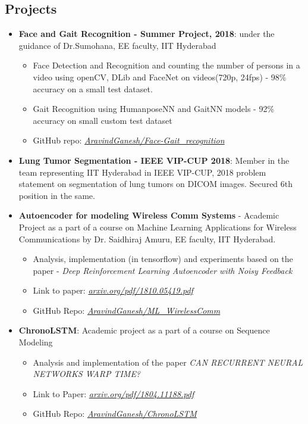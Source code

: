 \documentclass[10pt]{report} %
\begin{document}
\subsection{Projects}
\begin{itemize}
        \item \textbf{Face and Gait Recognition - Summer Project, 2018}: under the guidance of Dr.Sumohana, EE faculty, IIT Hyderabad 
        \begin{itemize}[*]
            \item Face Detection and Recognition and counting the number of persons in a video using openCV, DLib and FaceNet on videos(720p, 24fps) - 98\% accuracy on a small test dataset.
            \item Gait Recognition using HumanposeNN and GaitNN models - 92\% accuracy on small custom test dataset
            \item GitHub repo: \href{https://github.com/AravindGanesh/Face-Gait\_recognition}{\textit{AravindGanesh/Face-Gait\_recognition}}
        \end{itemize}
    
    \item \textbf{Lung Tumor Segmentation - IEEE VIP-CUP 2018}:
    Member in the team representing IIT Hyderabad in IEEE VIP-CUP, 2018 problem statement on segmentation of lung tumors on DICOM images. Secured 6th position in the same.
    \item \textbf{Autoencoder for modeling Wireless Comm Systems} - Academic Project as a part of a course on Machine Learning Applications for Wireless Communications by Dr. Saidhiraj Amuru, EE faculty, IIT Hyderabad.
    \begin{itemize}[*]
        \item Analysis, implementation (in tensorflow) and experiments based on the paper - \textit{Deep Reinforcement Learning Autoencoder with Noisy Feedback}
        \item Link to paper: \href{https://arxiv.org/pdf/1810.05419.pdf}{\textit{arxiv.org/pdf/1810.05419.pdf}}
        \item GitHub Repo: \href{https://github.com/AravindGanesh/ML\_WirelessComm}{\textit{AravindGanesh/ML\_WirelessComm}}

    \end{itemize}
    \item \textbf{ChronoLSTM}: Academic project as a part of a course on Sequence Modeling
    \begin{itemize}[*]
        \item Analysis and implementation of the paper \textit{CAN RECURRENT NEURAL NETWORKS WARP TIME?}
        \item Link to Paper: \href{ https://arxiv.org/pdf/1804.11188.pdf}{\textit{arxiv.org/pdf/1804.11188.pdf}}
        \item GitHub Repo: \href{https://github.com/AravindGanesh/ChronoLSTM}{\textit{AravindGanesh/ChronoLSTM}}


\end{itemize}
\end{itemize}
\end{document}
